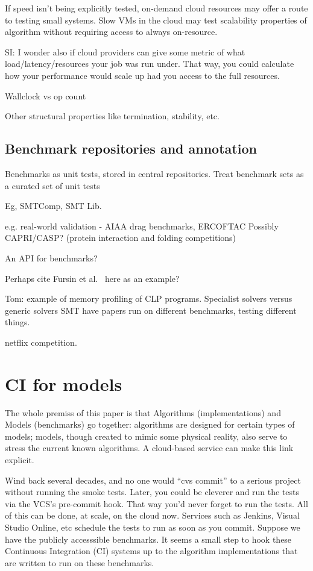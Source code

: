 \documentclass[conference]{IEEEtran}
\begin{document}
If speed isn't being explicitly tested, on-demand cloud resources 
may offer a route to testing small systems. Slow VMs in the cloud
may test scalability properties of algorithm without requiring access
to always on-resource.

SI: I wonder also if cloud providers can give some metric of what
load/latency/resources your job was run under.  That way, you could
calculate how your performance would scale up had you access to the
full resources. 


Wallclock vs op count

Other structural properties like termination, stability, etc. 

\subsection{Benchmark repositories and annotation}


Benchmarks as unit tests, stored in central repositories. 
Treat benchmark sets as a curated set of unit tests

Eg, SMTComp, SMT Lib. 

e.g. real-world validation - AIAA drag benchmarks, ERCOFTAC
	Possibly CAPRI/CASP? (protein interaction and folding competitions)

An API for benchmarks? 

Perhaps cite Fursin et al.~\cite{fursin-et-al:2014} here as an example?

Tom: 
example of memory profiling of CLP programs. Specialist solvers versus 
generic solvers SMT have papers run on different benchmarks, testing different 
things. 

netflix competition. 

\section{CI for models}


The whole premiss of this paper is that Algorithms (implementations)
and Models (benchmarks) go together: algorithms are designed for
certain types of models; models, though created to mimic some physical
reality, also serve to stress the current known algorithms. A
cloud-based service can make this link explicit.

Wind back several decades, and no one would ``cvs commit'' to a
serious project without running the smoke tests. Later, you could be
cleverer and run the tests via the VCS's pre-commit hook. That way
you'd never forget to run the tests. All of this can be done, at
scale, on the cloud now. Services such as Jenkins, Visual Studio
Online, etc schedule the tests to run as soon as you commit. Suppose
we have the publicly accesssible benchmarks. It seems a small step to
hook these Continuous Integration (CI) systems up to the algorithm
implementations that are written to run on these benchmarks.
\end{document}
